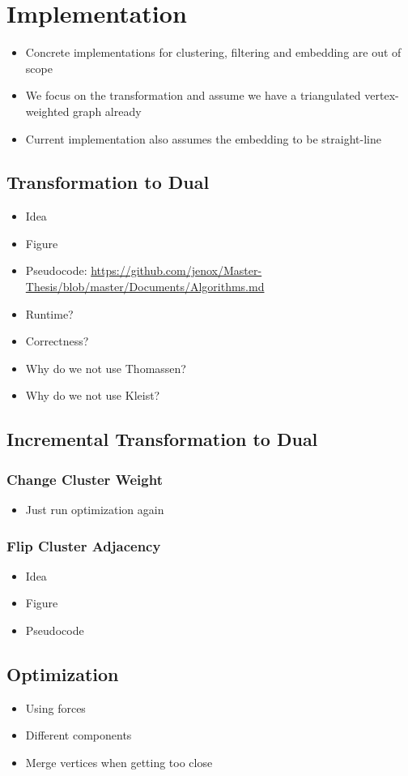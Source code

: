 \chapter{Implementation}
\label{chap:implementation}

\begin{itemize}
	\item Concrete implementations for clustering, filtering and embedding are out of scope
	\item We focus on the transformation and assume we have a triangulated vertex-weighted graph already
	\item Current implementation also assumes the embedding to be straight-line
\end{itemize}



\section{Transformation to Dual}

\begin{itemize}
	\item Idea
	\item Figure
	\item Pseudocode: \url{https://github.com/jenox/Master-Thesis/blob/master/Documents/Algorithms.md}
	\item Runtime?
	\item Correctness?
	\item Why do we not use Thomassen?
	\item Why do we not use Kleist?
\end{itemize}



\section{Incremental Transformation to Dual}

\subsection{Change Cluster Weight}

\begin{itemize}
	\item Just run optimization again
\end{itemize}

\subsection{Flip Cluster Adjacency}

\begin{itemize}
	\item Idea
	\item Figure
	\item Pseudocode
\end{itemize}



\section{Optimization}

\begin{itemize}
	\item Using forces
	\item Different components
	\item Merge vertices when getting too close
\end{itemize}
